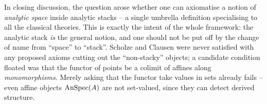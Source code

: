 \begin{remark}
\label{rmk:19:spaces-vs-stacks}
In closing discussion, the question arose whether one can axiomatise a notion of
\emph{analytic space} inside analytic stacks -- a single umbrella definition
specialising to all the classical theories. This is exactly the intent of the
whole framework: the analytic stack \emph{is} the general notion, and one should
not be put off by the change of name from ``space'' to ``stack''. Scholze and
Clausen were never satisfied with any proposed axioms cutting out the
``non-stacky'' objects; a candidate condition floated was that the functor of
points be a colimit of affines along \emph{monomorphisms}. Merely asking that the
functor take values in sets already fails -- even affine objects $\operatorname{AnSpec}(A)$ are
not set-valued, since they can detect derived structure.
\end{remark}
